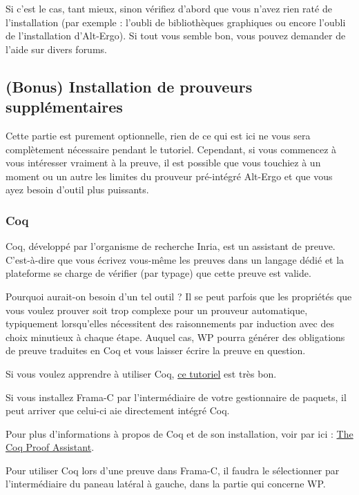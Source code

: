\documentclass[12pt,francais,]{scrbook}
\newenvironment{zdsblock}[1]{%
  \tcolorbox[beamer,%
    noparskip,breakable,
    colback=LightBlue,colframe=DarkBlue,%
    colbacklower=DarkBlue,%
    title=#1]
}{\endtcolorbox}
\begin{document}
Si c'est le cas, tant mieux, sinon vérifiez d'abord que vous n'avez rien
raté de l'installation (par exemple : l'oubli de bibliothèques
graphiques ou encore l'oubli de l'installation d'Alt-Ergo). Si tout vous
semble bon, vous pouvez demander de l'aide sur divers forums.

\subsection{(Bonus) Installation de prouveurs
supplémentaires}\label{bonus-installation-de-prouveurs-suppluxe9mentaires}

Cette partie est purement optionnelle, rien de ce qui est ici ne vous
sera complètement nécessaire pendant le tutoriel. Cependant, si vous
commencez à vous intéresser vraiment à la preuve, il est possible que
vous touchiez à un moment ou un autre les limites du prouveur
pré-intégré Alt-Ergo et que vous ayez besoin d'outil plus puissants.

\subsubsection{Coq}\label{coq}

Coq, développé par l'organisme de recherche Inria, est un assistant de
preuve. C'est-à-dire que vous écrivez vous-même les preuves dans un
langage dédié et la plateforme se charge de vérifier (par typage) que
cette preuve est valide.

Pourquoi aurait-on besoin d'un tel outil ? Il se peut parfois que les
propriétés que vous voulez prouver soit trop complexe pour un prouveur
automatique, typiquement lorsqu'elles nécessitent des raisonnements par
induction avec des choix minutieux à chaque étape. Auquel cas, WP pourra
générer des obligations de preuve traduites en Coq et vous laisser
écrire la preuve en question.

Si vous voulez apprendre à utiliser Coq,
\href{http://www.cis.upenn.edu/~bcpierce/sf/current/index.html}{ce
tutoriel} est très bon.

\begin{zdsblock}{Information}
Si vous installez Frama-C par
l'intermédiaire de votre gestionnaire de paquets, il peut
arriver que celui-ci aie directement intégré Coq.

Pour plus d'informations à propos de Coq et de son installation, voir
par ici : \href{https://coq.inria.fr/}{The Coq Proof Assistant}.

Pour utiliser Coq lors d'une preuve dans Frama-C, il faudra le
sélectionner par l'intermédiaire du paneau latéral à gauche, dans la
partie qui concerne WP.
\end{zdsblock}
\end{document}
